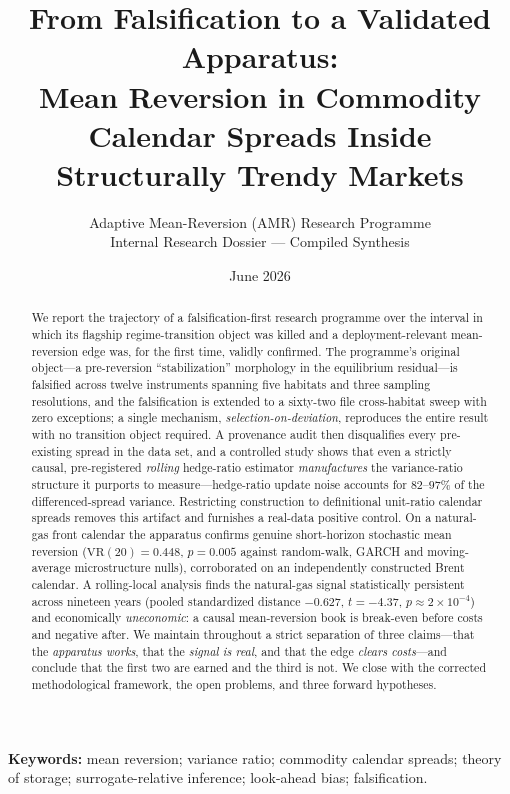 \documentclass[11pt,a4paper]{article}
\title{\bfseries From Falsification to a Validated Apparatus:\\[2pt]
\large Mean Reversion in Commodity Calendar Spreads Inside Structurally Trendy Markets}
\author{Adaptive Mean-Reversion (AMR) Research Programme\\
\small Internal Research Dossier --- Compiled Synthesis}
\date{June 2026}
\newcommand{\VR}{\mathrm{VR}}
\begin{document}
\maketitle

\begin{abstract}
\noindent
We report the trajectory of a falsification-first research programme over the interval in which its
flagship regime-transition object was killed and a deployment-relevant mean-reversion edge was, for
the first time, validly confirmed. The programme's original object---a pre-reversion ``stabilization''
morphology in the equilibrium residual---is falsified across twelve instruments spanning five habitats
and three sampling resolutions, and the falsification is extended to a sixty-two file cross-habitat
sweep with zero exceptions; a single mechanism, \emph{selection-on-deviation}, reproduces the entire
result with no transition object required. A provenance audit then disqualifies every pre-existing
spread in the data set, and a controlled study shows that even a strictly causal, pre-registered
\emph{rolling} hedge-ratio estimator \emph{manufactures} the variance-ratio structure it purports to
measure---hedge-ratio update noise accounts for $82$--$97\%$ of the differenced-spread variance.
Restricting construction to definitional unit-ratio calendar spreads removes this artifact and
furnishes a real-data positive control. On a natural-gas front calendar the apparatus confirms genuine
short-horizon stochastic mean reversion ($\VR(20)=0.448$, $p=0.005$ against random-walk, GARCH and
moving-average microstructure nulls), corroborated on an independently constructed Brent calendar.
A rolling-local analysis finds the natural-gas signal statistically persistent across nineteen years
(pooled standardized distance $-0.627$, $t=-4.37$, $p\approx 2\times10^{-4}$) and economically
\emph{uneconomic}: a causal mean-reversion book is break-even before costs and negative after. We
maintain throughout a strict separation of three claims---that the \emph{apparatus works}, that the
\emph{signal is real}, and that the edge \emph{clears costs}---and conclude that the first two are
earned and the third is not. We close with the corrected methodological framework, the open problems,
and three forward hypotheses.
\end{abstract}

\noindent\textbf{Keywords:} mean reversion; variance ratio; commodity calendar spreads; theory of
storage; surrogate-relative inference; look-ahead bias; falsification.
\end{document}

